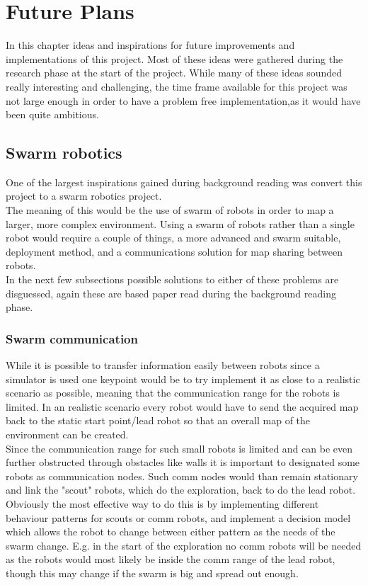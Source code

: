 \chapter{Future Plans}
\label{Future_plans}
In this chapter ideas and inspirations for future improvements and implementations of this project. 
Most of these ideas were gathered during the research phase at the start of the project. While many of these ideas sounded really interesting and challenging, the time frame available for this project was not large enough in order to have a problem free implementation,as it would have been quite ambitious. 

\section{Swarm robotics}
One of the largest inspirations gained during background reading was convert this project to a swarm robotics project. \\
The meaning of this would be the use of swarm of robots in order to map a larger, more complex environment. Using a swarm of robots rather than a single robot would require a couple of things, a more advanced and swarm suitable, deployment method, 
and a communications solution for map sharing between robots. \\[3ex]

In the next few subsections possible solutions to either of these problems are disguessed, again these are based paper read during the background reading phase.
\subsection{Swarm communication}
\label{communication}
While it is possible to transfer information easily between robots since a simulator is used one keypoint would be to try implement it as close to a realistic scenario as possible, meaning that the communication range for the robots is limited. In an realistic scenario every robot would have to send the acquired map back to the static start point/lead robot so that an overall map of the environment can be created. \\
Since the communication range for such small robots is limited and can be even further obstructed through obstacles like walls it is important to designated some robots as communication nodes. Such comm nodes would than remain stationary and link the "scout" robots, which do the exploration, back to do the lead robot. \\
Obviously the most effective way to do this is by implementing different behaviour patterns for scouts or comm robots, and implement a decision model which allows the robot to change between either pattern as the needs of the swarm change. E.g. in the start of the exploration no comm robots will be needed as the robots would most likely be inside the comm range of the lead robot, though this may change if the swarm is big and spread out enough. \\[3ex]

